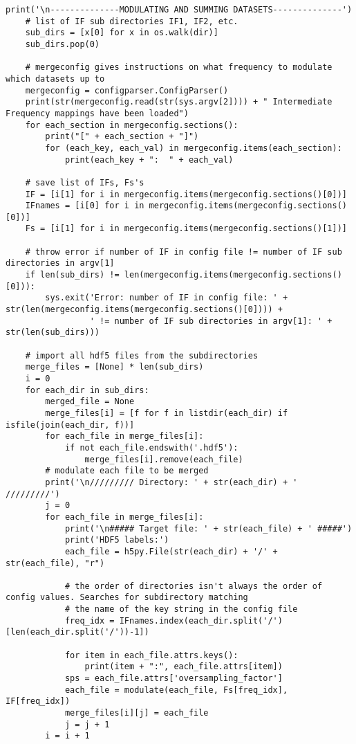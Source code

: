 \begin{lstlisting}[breaklines]
    print('\n--------------MODULATING AND SUMMING DATASETS--------------')
    # list of IF sub directories IF1, IF2, etc.
    sub_dirs = [x[0] for x in os.walk(dir)]
    sub_dirs.pop(0)

    # mergeconfig gives instructions on what frequency to modulate which datasets up to
    mergeconfig = configparser.ConfigParser()
    print(str(mergeconfig.read(str(sys.argv[2]))) + " Intermediate Frequency mappings have been loaded")
    for each_section in mergeconfig.sections():
        print("[" + each_section + "]")
        for (each_key, each_val) in mergeconfig.items(each_section):
            print(each_key + ":  " + each_val)

    # save list of IFs, Fs's
    IF = [i[1] for i in mergeconfig.items(mergeconfig.sections()[0])]
    IFnames = [i[0] for i in mergeconfig.items(mergeconfig.sections()[0])]
    Fs = [i[1] for i in mergeconfig.items(mergeconfig.sections()[1])]

    # throw error if number of IF in config file != number of IF sub directories in argv[1]
    if len(sub_dirs) != len(mergeconfig.items(mergeconfig.sections()[0])):
        sys.exit('Error: number of IF in config file: ' + str(len(mergeconfig.items(mergeconfig.sections()[0]))) +
                 ' != number of IF sub directories in argv[1]: ' + str(len(sub_dirs)))

    # import all hdf5 files from the subdirectories
    merge_files = [None] * len(sub_dirs)
    i = 0
    for each_dir in sub_dirs:
        merged_file = None
        merge_files[i] = [f for f in listdir(each_dir) if isfile(join(each_dir, f))]
        for each_file in merge_files[i]:
            if not each_file.endswith('.hdf5'):
                merge_files[i].remove(each_file)
        # modulate each file to be merged
        print('\n///////// Directory: ' + str(each_dir) + ' /////////')
        j = 0
        for each_file in merge_files[i]:
            print('\n##### Target file: ' + str(each_file) + ' #####')
            print('HDF5 labels:')
            each_file = h5py.File(str(each_dir) + '/' + str(each_file), "r")

            # the order of directories isn't always the order of config values. Searches for subdirectory matching
            # the name of the key string in the config file
            freq_idx = IFnames.index(each_dir.split('/')[len(each_dir.split('/'))-1])

            for item in each_file.attrs.keys():
                print(item + ":", each_file.attrs[item])
            sps = each_file.attrs['oversampling_factor']
            each_file = modulate(each_file, Fs[freq_idx], IF[freq_idx])
            merge_files[i][j] = each_file
            j = j + 1
        i = i + 1


\end{lstlisting}
